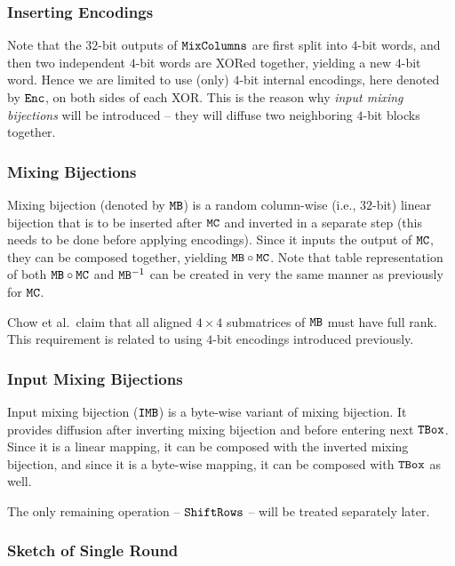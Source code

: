 \subsubsection{Inserting Encodings}
	
	Note that the $32$-bit outputs of $\texttt{MixColumns}$ are first split into $4$-bit words, and then two independent $4$-bit words are XORed together, yielding a new $4$-bit word. Hence we are limited to use (only) $4$-bit internal encodings, here denoted by $\texttt{Enc}$, on both sides of each XOR. This is the reason why {\em input mixing bijections} will be introduced -- they will diffuse two neighboring $4$-bit blocks together.

\subsubsection{Mixing Bijections}
	
	Mixing bijection (denoted by $\texttt{MB}$) is a random column-wise (i.e., $32$-bit) linear bijection that is to be inserted after $\texttt{MC}$ and inverted in a separate step (this needs to be done before applying encodings). Since it inputs the output of $\texttt{MC}$, they can be composed together, yielding $\texttt{MB}\circ\texttt{MC}$. Note that table representation of both $\texttt{MB}\circ\texttt{MC}$ and $\texttt{MB}^{-1}$ can be created in very the same manner as previously for $\texttt{MC}$.
	
	\begin{note}
	\label{note:fullrank}
		Chow et al.\ claim that all aligned $4\times4$ submatrices of $\texttt{MB}$ must have full rank. This requirement is related to using $4$-bit encodings introduced previously.
	\end{note}

\subsubsection{Input Mixing Bijections}
	
	Input mixing bijection ($\texttt{IMB}$) is a byte-wise variant of mixing bijection. It provides diffusion after inverting mixing bijection and before entering next $\texttt{TBox}$. Since it is a linear mapping, it can be composed with the inverted mixing bijection, and since it is a byte-wise mapping, it can be composed with $\texttt{TBox}$ as well.
	
	The only remaining operation -- $\texttt{ShiftRows}$ -- will be treated separately later.

\subsubsection{Sketch of Single Round}
	
